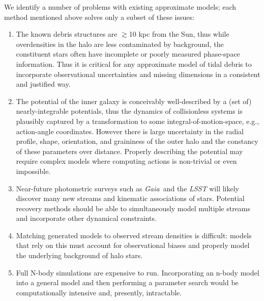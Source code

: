 \documentclass[letterpaper,12pt,preprint]{aastex}
\newcommand{\project}[1]{\textsl{#1}}
\newcommand{\gaia}{\project{Gaia}}
\begin{document}
We identify a number of problems with existing approximate models; each method mentioned above solves only a subset of these issues:
\begin{enumerate}
	\item The known debris structures are $\gtrsim$10 kpc from the Sun, thus while overdensities in the halo are less contaminated by background, the constituent stars often have incomplete or poorly measured phase-space information. Thus it is critical for any approximate model of tidal debris to incorporate observational uncertainties and missing dimensions in a consistent and justified way. 
	\item The potential of the inner galaxy is conceivably well-described by a (set of) nearly-integrable potentials, thus the dynamics of collisionless systems is plausibly captured by a transformation to some integral-of-motion-space, e.g., action-angle coordinates. However there is large uncertainty in the radial profile, shape, orientation, and graininess of the outer halo and the constancy of these parameters over distance. Properly describing the potential may require complex models where computing actions is non-trivial or even impossible.
	\item Near-future photometric surveys such as \gaia\, and the \project{LSST} will likely discover many new streams and kinematic associations of stars. Potential recovery methods should be able to simultaneously model multiple streams and incorporate other dynamical constraints.
	\item Matching generated models to observed stream densities is difficult: models that rely on this must account for observational biases and properly model the underlying background of halo stars. 
	\item Full N-body simulations are expensive to run. Incorporating an n-body model into a general model and then performing a parameter search would be computationally intensive and, presently, intractable. 
\end{enumerate}
\end{document}
